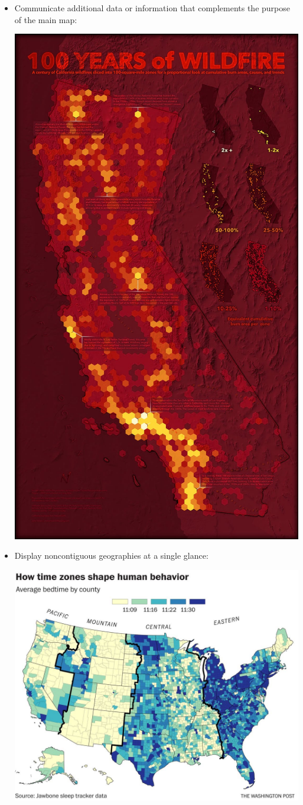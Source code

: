 \documentclass[oneside,a4paper,11pt,explicit]{book}
\begin{document}
\begin{tcolorbox}[enhanced jigsaw,breakable,pad at break*=1mm,
  colback=yellow!5!white,colframe=IceCreamLeaf,title=Inset Maps]
\begin{itemize}
         \item Communicate additional data or information that complements the purpose of the main map:

         \vspace{.25em}

         \centerline{\includegraphics[width=.5\textwidth]{inset-multiples.jpg}}

         \item Display noncontiguous geographies at a single glance:

         \vspace{.25em}

         \centerline{\includegraphics[width=.65\textwidth]{inset-noncontiguous.jpg}}
    \end{itemize}
\end{tcolorbox}
\end{document}
